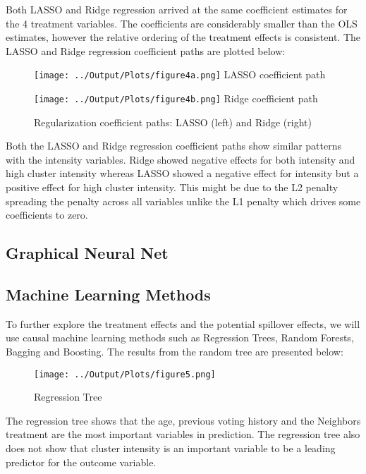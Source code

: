 \documentclass[11pt]{article}
\begin{document}
Both LASSO and Ridge regression arrived at the same coefficient estimates for the 4 treatment variables. The coefficients are considerably smaller than the OLS estimates, however the relative ordering of the treatment effects is consistent. The LASSO and Ridge regression coefficient paths are plotted below:
\begin{figure}[H]
    \centering
    \begin{minipage}[t]{0.48\textwidth}
        \centering
        \texttt{[image: ../Output/Plots/figure4a.png]}
        \vspace{0.3em}
        {\small LASSO coefficient path}
    \end{minipage}
    \hfill
    \begin{minipage}[t]{0.48\textwidth}
        \centering
        \texttt{[image: ../Output/Plots/figure4b.png]}
        \vspace{0.3em}
        {\small Ridge coefficient path}
    \end{minipage}
    \caption{Regularization coefficient paths: LASSO (left) and Ridge (right)}
    \label{fig:coef_paths}
\end{figure}

Both the LASSO and Ridge regression coefficient paths show similar patterns with the intensity variables. Ridge showed negative effects for both intensity and high cluster intensity whereas LASSO showed a negative effect for intensity but a positive effect for high cluster intensity. This might be due to the L2 penalty spreading the penalty across all variables unlike the L1 penalty which drives some coefficients to zero.

\subsection{Graphical Neural Net}


\subsection{Machine Learning Methods}
To further explore the treatment effects and the potential spillover effects, we will use causal machine learning methods such as Regression Trees, Random Forests, Bagging and Boosting. The results from the random tree are presented below:
\begin{figure}[H]
    \centering
    \texttt{[image: ../Output/Plots/figure5.png]}   
    \caption{Regression Tree}
    \label{fig:regression_tree}
\end{figure}
The regression tree shows that the age, previous voting history and the Neighbors treatment are the most important variables in prediction. The regression tree also does not show that cluster intensity is an important variable to be a leading predictor for the outcome variable.
\end{document}
